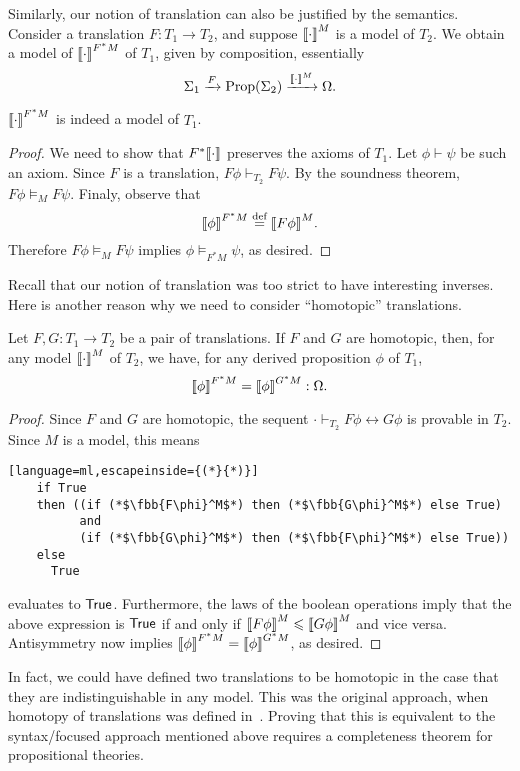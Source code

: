 \documentclass{../thesis-note}
\begin{document}
Similarly, our notion of translation can also be justified by the
semantics. Consider a translation \(F: T_1 \to T_2\), and suppose
\({\left\llbracket{\cdot}\right\rrbracket}^M\) is a model of \(T_2\). We obtain a model of
\({\left\llbracket{\cdot}\right\rrbracket}^{F^* M}\) of \(T_1\), given by composition, essentially
\[%
  \Sigma_1 \xrightarrow{F} \text{Prop}(\Sigma_2) \xrightarrow{\fbb{\cdot}^M}
  \Omega.
\]%
\begin{proposition}
  \({\left\llbracket{\cdot}\right\rrbracket}^{F^* M}\) is indeed a model of \(T_1\).
\end{proposition}
\begin{proof}
  We need to show that \(F^*{\left\llbracket{\cdot}\right\rrbracket}\) preserves the axioms of \(T_1\). Let
  \(\phi \vdash \psi\) be such an axiom. Since \(F\) is a translation, \(F\phi
  \vdash_{T_2} F\psi\). By the soundness theorem, \(F\phi \vDash_M
  F\psi\). Finaly, observe that
  \[%
    \fbb{\phi}^{F^* M} \eqdef \fbb{F\phi}^M.
  \]%
  Therefore \(F\phi \vDash_M F\psi\) implies \(\phi \vDash_{F^* M} \psi\), as
  desired.
\end{proof}
Recall that our notion of translation was too strict to have interesting
inverses. Here is another reason why we need to consider ``homotopic''
translations.
\begin{proposition}
  Let \(F, G : T_1 \to T_2\) be a pair of translations. If \(F\) and \(G\) are
  homotopic, then, for any model \({\left\llbracket{\cdot}\right\rrbracket}^M\) of \(T_2\), we have, for any
  derived proposition \(\phi\) of \(T_1\),
  \[%
    \fbb{\phi}^{F^* M} = \fbb{\phi}^{G^* M} : \Omega.
  \]%
\end{proposition}
\begin{proof}
  Since \(F\) and \(G\) are homotopic, the sequent \(\cdot \vdash_{T_2} F\phi
  \leftrightarrow G\phi\) is provable in \(T_2\). Since \(M\) is a model, this
  means
  \begin{lstlisting}[language=ml,escapeinside={(*}{*)}]
    if True
    then ((if (*$\fbb{F\phi}^M$*) then (*$\fbb{G\phi}^M$*) else True)
          and
          (if (*$\fbb{G\phi}^M$*) then (*$\fbb{F\phi}^M$*) else True))
    else
      True      
  \end{lstlisting}
  evaluates to \(\operatorname{{\mathsf{True}}}\). Furthermore, the laws of the boolean operations imply
  that the above expression is \(\operatorname{{\mathsf{True}}}\) if and only if
  \({\left\llbracket{F\phi}\right\rrbracket}^M \leqslant {\left\llbracket{G\phi}\right\rrbracket}^M\) and vice versa. Antisymmetry now implies
  \({\left\llbracket{\phi}\right\rrbracket}^{F^* M} = {\left\llbracket{\phi}\right\rrbracket}^{G^* M}\), as desired.
\end{proof}
In fact, we could have defined two translations to be homotopic in the case that
they are indistinguishable in any model. This was the original approach, when
homotopy of translations was defined in~\cite{Ahlbrandt1986}. Proving that this
is equivalent to the syntax\-/focused approach mentioned above requires a
completeness theorem for propositional theories.
\end{document}
